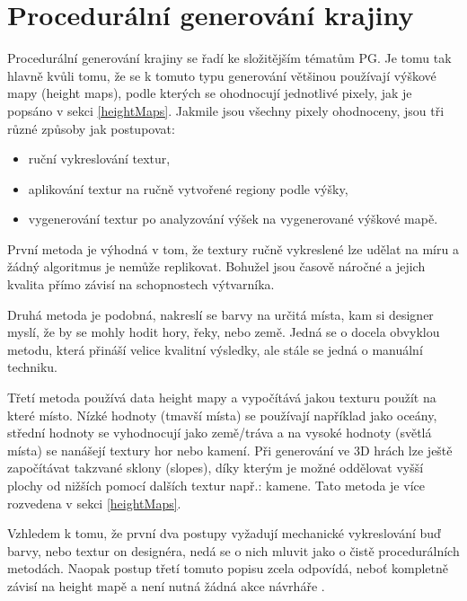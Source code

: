 \iffalse
\chapter{Procedurální generování krajiny}
\label{terrain}
Procedurální generování krajiny se řadí ke složitějším tématům PG. Je tomu tak hlavně kvůli tomu, že se k tomuto typu generování většinou používají výškové mapy (height maps), podle kterých se ohodnocují jednotlivé pixely, jak je popsáno v sekci \ref{heightMaps}. Jakmile jsou všechny pixely ohodnoceny, jsou tři různé způsoby jak postupovat:
\begin{itemize}
	\item ruční vykreslování textur,
	\item aplikování textur na ručně vytvořené regiony podle výšky,
	\item vygenerování textur po analyzování výšek na vygenerované výškové mapě.
\end{itemize}
První metoda je výhodná v tom, že textury ručně vykreslené lze udělat na míru a žádný algoritmus je nemůže replikovat. Bohužel jsou časově náročné a jejich kvalita přímo závisí na schopnostech výtvarníka.

Druhá metoda je podobná, nakreslí se barvy na určitá místa, kam si designer myslí, že by se mohly hodit hory, řeky, nebo země. Jedná se o docela obvyklou metodu, která přináší velice kvalitní výsledky, ale stále se jedná o manuální techniku.

Třetí metoda používá data height mapy a vypočítává jakou texturu použít na které místo. Nízké hodnoty (tmavší místa) se používají například jako oceány, střední hodnoty se vyhodnocují jako země/tráva a na vysoké hodnoty (světlá místa) se nanášejí textury hor nebo kamení. Při generování ve 3D hrách lze ještě započítávat takzvané sklony (slopes), díky kterým je možné oddělovat vyšší plochy od nižších pomocí dalších textur např.: kamene. Tato metoda je více rozvedena v sekci \ref{heightMaps}.

Vzhledem k tomu, že první dva postupy vyžadují mechanické vykreslování buď barvy, nebo textur on designéra, nedá se o nich mluvit jako o čistě procedurálních metodách. Naopak postup třetí tomuto popisu zcela odpovídá, neboť kompletně závisí na height mapě a není nutná žádná akce návrháře \cite{madoc59000}.

